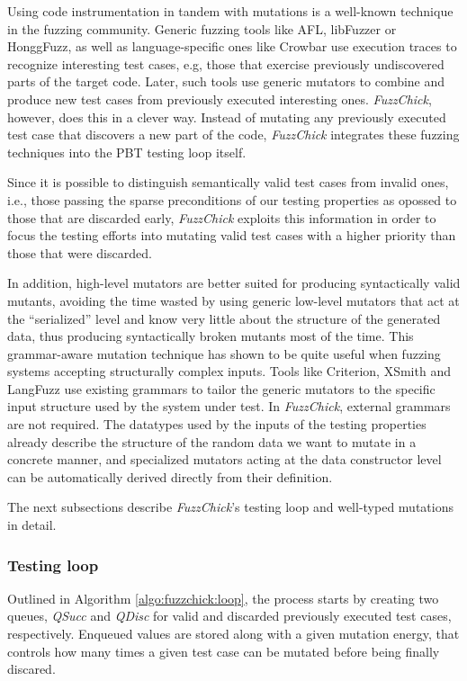 \documentclass[acmsmall, anonymous]{acmart}
\newcommand{\fuzzchick}{\textit{FuzzChick}\xspace}
\begin{document}
Using code instrumentation in tandem with mutations is a well-known technique in
the fuzzing community.
%
Generic fuzzing tools like AFL, libFuzzer or HonggFuzz, as well as
language-specific ones like Crowbar use execution traces to recognize
interesting test cases, e.g, those that exercise previously undiscovered parts
of the target code.
%
Later, such tools use generic mutators to combine and produce new test cases
from previously executed interesting ones.
%
\fuzzchick, however, does this in a clever way.
%
Instead of mutating any previously executed test case that discovers a new part
of the code, \fuzzchick integrates these fuzzing techniques into the PBT testing
loop itself.


Since it is possible to distinguish semantically valid test cases from invalid
ones, i.e., those passing the sparse preconditions of our testing properties as
opossed to those that are discarded early, \fuzzchick exploits this information
in order to focus the testing efforts into mutating valid test cases with a
higher priority than those that were discarded.


In addition, high-level mutators are better suited for producing syntactically
valid mutants, avoiding the time wasted by using generic low-level mutators that
act at the ``serialized'' level and know very little about the structure of the
generated data, thus producing syntactically broken mutants most of the time.
%
This grammar-aware mutation technique has shown to be quite useful when fuzzing
systems accepting structurally complex inputs.
%
Tools like Criterion, XSmith and LangFuzz use existing grammars to tailor the
generic mutators to the specific input structure used by the system under test.
%
In \fuzzchick, external grammars are not required.
%
The datatypes used by the inputs of the testing properties already describe the
structure of the random data we want to mutate in a concrete manner, and
specialized mutators acting at the data constructor level can be automatically
derived directly from their definition.

The next subsections describe \fuzzchick's testing loop and well-typed mutations
in detail.

\subsubsection{Testing loop}

Outlined in Algorithm \ref{algo:fuzzchick:loop}, the process starts by creating
two queues, \textit{QSucc} and \textit{QDisc} for valid and discarded previously
executed test cases, respectively.
%
Enqueued values are stored along with a given mutation energy, that controls how
many times a given test case can be mutated before being finally discared.
\end{document}
